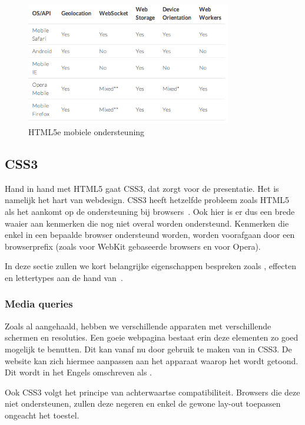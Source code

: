 \begin{figure}
  \centering
  \includegraphics[width=0.8\textwidth]{figuren/html5e}
  \caption{HTML5e mobiele ondersteuning~\cite{Hales2012}}
  \label{fig:html5e}
\end{figure}

\subsection{CSS3}
\label{ref:css3}
Hand in hand met HTML5 gaat CSS3, dat zorgt voor de presentatie. Het is namelijk het hart van webdesign. CSS3 heeft hetzelfde probleem zoals HTML5 als het aankomt op de ondersteuning bij browsers~\cite{MacDonald2011}. Ook hier is er dus een brede waaier aan kenmerken die nog niet overal worden ondersteund. Kenmerken die enkel in een bepaalde browser ondersteund worden, worden voorafgaan door een browserprefix (zoals  voor WebKit gebaseerde browsers en  voor Opera).

In deze sectie zullen we kort belangrijke eigenschappen bespreken zoals , effecten en lettertypes aan de hand van~\cite{MacDonald2011}.

\subsubsection{Media queries}
Zoals al aangehaald, hebben we verschillende apparaten met verschillende schermen en resoluties. Een goeie webpagina bestaat erin deze elementen zo goed mogelijk te benutten. Dit kan vanaf nu door gebruik te maken van  in CSS3. De website kan zich hiermee aanpassen aan het apparaat waarop het wordt getoond. Dit wordt in het Engels omschreven als .

Ook CSS3 volgt het principe van achterwaartse compatibiliteit. Browsers die deze  niet ondersteunen, zullen deze negeren en enkel de gewone lay-out toepassen ongeacht het toestel.

